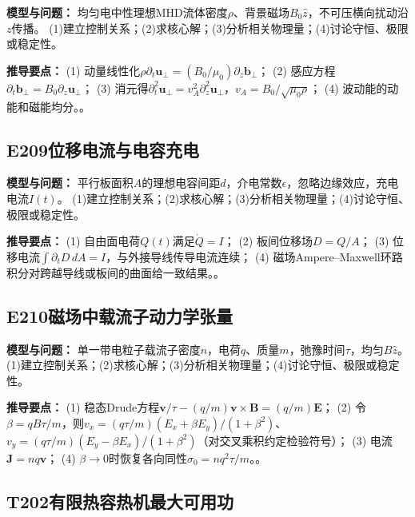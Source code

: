 \textbf{模型与问题：} 均匀电中性理想MHD流体密度$\rho$、背景磁场$B_0\hat z$，不可压横向扰动沿$z$传播。 (1)建立控制关系；(2)求核心解；(3)分析相关物理量；(4)讨论守恒、极限或稳定性。

\par\textbf{推导要点：} (1) 动量线性化$\rho\partial_t\mathbf u_\perp=(B_0/\mu_0)\partial_z\mathbf b_\perp$； (2) 感应方程$\partial_t\mathbf b_\perp=B_0\partial_z\mathbf u_\perp$； (3) 消元得$\partial_t^2\mathbf u_\perp=v_A^2\partial_z^2\mathbf u_\perp$，$v_A=B_0/\sqrt{\mu_0\rho}$； (4) 波动能的动能和磁能均分。。

\par\medskip

\subsection*{E209\quad 位移电流与电容充电}

\textbf{模型与问题：} 平行板面积$A$的理想电容间距$d$，介电常数$\epsilon$，忽略边缘效应，充电电流$I(t)$。 (1)建立控制关系；(2)求核心解；(3)分析相关物理量；(4)讨论守恒、极限或稳定性。

\par\textbf{推导要点：} (1) 自由面电荷$Q(t)$满足$\dot Q=I$； (2) 板间位移场$D=Q/A$； (3) 位移电流$\int\partial_tD\,dA=I$，与外接导线传导电流连续； (4) 磁场Ampere–Maxwell环路积分对跨越导线或板间的曲面给一致结果。。

\par\medskip

\subsection*{E210\quad 磁场中载流子动力学张量}

\textbf{模型与问题：} 单一带电粒子载流子密度$n$，电荷$q$、质量$m$，弛豫时间$\tau$，均匀$B\hat z$。 (1)建立控制关系；(2)求核心解；(3)分析相关物理量；(4)讨论守恒、极限或稳定性。

\par\textbf{推导要点：} (1) 稳态Drude方程$\mathbf v/\tau-(q/m)\mathbf v\times\mathbf B=(q/m)\mathbf E$； (2) 令$\beta=qB\tau/m$，则$v_x=(q\tau/m)(E_x+\beta E_y)/(1+\beta^2)$、$v_y=(q\tau/m)(E_y-\beta E_x)/(1+\beta^2)$（对交叉乘积约定检验符号）； (3) 电流$\mathbf J=nq\mathbf v$； (4) $\beta\to0$时恢复各向同性$\sigma_0=nq^2\tau/m$。。

\par\medskip

\subsection*{T202\quad 有限热容热机最大可用功}

